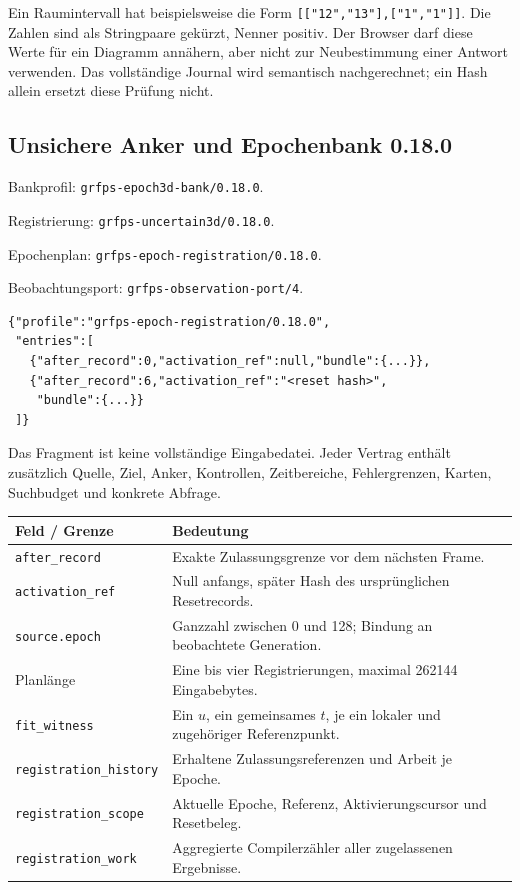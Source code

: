 \documentclass[11pt,a4paper]{article}
\begin{document}
Ein Raumintervall hat beispielsweise die Form
\texttt{[["12","13"],["1","1"]]}. Die Zahlen sind als
Stringpaare gekürzt, Nenner positiv. Der Browser darf diese Werte
für ein Diagramm annähern, aber nicht zur Neubestimmung einer
Antwort verwenden. Das vollständige Journal wird semantisch
nachgerechnet; ein Hash allein ersetzt diese Prüfung nicht.


\clearpage
\subsection{Unsichere Anker und Epochenbank 0.18.0}
Bankprofil: \texttt{grfps-epoch3d-bank/0.18.0}.\par
Registrierung: \texttt{grfps-uncertain3d/0.18.0}.\par
Epochenplan: \texttt{grfps-epoch-registration/0.18.0}.\par
Beobachtungsport: \texttt{grfps-observation-port/4}.

\begin{lstlisting}
{"profile":"grfps-epoch-registration/0.18.0",
 "entries":[
   {"after_record":0,"activation_ref":null,"bundle":{...}},
   {"after_record":6,"activation_ref":"<reset hash>",
    "bundle":{...}}
 ]}
\end{lstlisting}
Das Fragment ist keine vollständige Eingabedatei. Jeder Vertrag
enthält zusätzlich Quelle, Ziel, Anker, Kontrollen, Zeitbereiche,
Fehlergrenzen, Karten, Suchbudget und konkrete Abfrage.

\begin{tabularx}{\linewidth}{@{}lY@{}}\toprule
Feld / Grenze & Bedeutung\\\midrule
\texttt{after\_record} & Exakte Zulassungsgrenze vor dem nächsten Frame.\\
\texttt{activation\_ref} & Null anfangs, später Hash des ursprünglichen Resetrecords.\\
\texttt{source.epoch} & Ganzzahl zwischen 0 und 128; Bindung an beobachtete Generation.\\
Planlänge & Eine bis vier Registrierungen, maximal 262144 Eingabebytes.\\
\texttt{fit\_witness} & Ein $u$, ein gemeinsames $t$, je ein lokaler und zugehöriger Referenzpunkt.\\
\texttt{registration\_history} & Erhaltene Zulassungsreferenzen und Arbeit je Epoche.\\
\texttt{registration\_scope} & Aktuelle Epoche, Referenz, Aktivierungscursor und Resetbeleg.\\
\texttt{registration\_work} & Aggregierte Compilerzähler aller zugelassenen Ergebnisse.\\\bottomrule
\end{tabularx}
\end{document}
